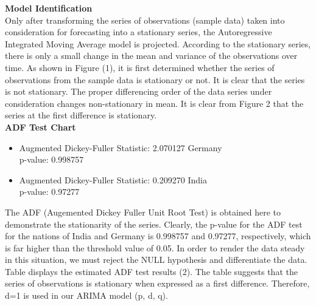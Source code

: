 \documentclass[conference]{IEEEtran}
\begin{document}
\textbf{Model Identification}\\
Only after transforming the series of observations (sample data) taken into consideration for forecasting into a stationary series, the Autoregressive Integrated Moving Average model is projected. According to the stationary series, there is only a small change in the mean and variance of the observations over time. As shown in Figure (1), it is first determined whether the series of observations from the sample data is stationary or not. It is clear that the series is not stationary. The proper differencing order of the data series under consideration changes non-stationary in mean. It is clear from Figure 2 that the series at the first difference is stationary.
\\
\textbf{ADF Test Chart}
\begin{itemize}
    \item Augmented Dickey-Fuller Statistic: 2.070127 Germany
          \\p-value: 0.998757
    \item Augmented Dickey-Fuller Statistic: 0.209270 India
          \\p-value: 0.97277
\end{itemize}


The ADF (Augemented Dickey Fuller Unit Root Test) is obtained here to demonstrate the stationarity of the series. Clearly, the p-value for the ADF test for the nations of India and Germany is 0.998757 and 0.97277, respectively, which is far higher than the threshold value of 0.05. In order to render the data steady in this situation, we must reject the NULL hypothesis and differentiate the data. Table displays the estimated ADF test results (2). The table suggests that the series of observations is stationary when expressed as a first difference. Therefore, d=1 is used in our ARIMA model (p, d, q).
\end{document}
